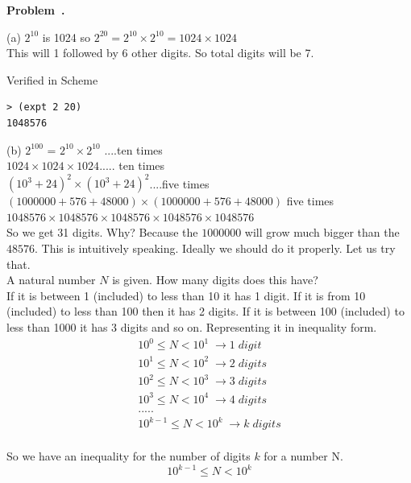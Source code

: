 \documentclass[10pt]{article}
\newcounter{problem}
\newenvironment{problem}[1][]{
  \refstepcounter{problem}
  \par\noindent\textbf{Problem~\theproblem. #1}\par
  \vspace{0.5em}
}{\vspace{1em}}
\begin{document}
\begin{problem} %
(a) $2^{10}$ is 1024 so $2^{20} = 2^{10} \times 2^{10} = 1024 \times 1024$\\
This will 1 followed by 6 other digits. So total digits will be 7.

Verified in Scheme
\begin{lstlisting}
> (expt 2 20)
1048576
\end{lstlisting}

(b) $2^{100}$ = $2^{10} \times 2^{10}$ ....ten times\\
$1024 \times 1024 \times 1024$..... ten times\\
$(10^3 + 24)^2 \times (10^3 + 24)^2$....five times\\
$(1000000 + 576 + 48000) \times (1000000 + 576 + 48000)$ five times\\
$1048576 \times 1048576 \times 1048576 \times 1048576 \times 1048576 $\\
So we get 31 digits. Why? Because the $1000000$ will grow much bigger than the $48576$. This is intuitively speaking.
Ideally we should do it properly. Let us try that.\\

A natural number $N$ is given. How many digits does this have?\\
If it is between 1 (included) to less than 10 it has 1 digit. If it is from 10 (included) to less than 100 then it has 2 digits.
If it is between 100 (included) to less than 1000 it has 3 digits and so on. Representing it in inequality form.\\
\begin{gather*}
10^0 \le N < 10^1 \; \rightarrow 1 \;digit\\
10^1 \le N < 10^2 \; \rightarrow 2 \;digits\\
10^2 \le N < 10^3 \; \rightarrow 3 \;digits\\
10^3 \le N < 10^4 \; \rightarrow 4 \;digits\\
.....\\
10^{k-1} \le N < 10^k \; \rightarrow k \;digits\\
\end{gather*}

So we have an inequality for the number of digits $k$ for a number N. 
\[
10^{k-1} \le N < 10^k
\]


\end{problem}
\end{document}
